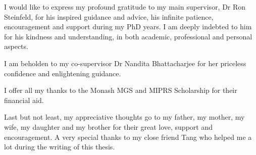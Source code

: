 
\begin{acknowledgements}      

I would like to express my profound gratitude to my main supervisor, Dr Ron Steinfeld, for his inspired guidance and advice, his infinite patience, encouragement and support during my PhD years. I am deeply indebted to him for his kindness and understanding, in both academic, professional and personal aspects.

I am beholden to my co-supervisor Dr Nandita Bhattacharjee for her priceless confidence and enlightening guidance.

I offer all my thanks to the Monash MGS and MIPRS Scholarship for their financial aid.

Last but not least, my appreciative thoughts go to my father, my mother, my wife, my daughter and my brother for their great love, support and encouragement. A very special thanks to my close friend Tang who helped me a lot during the writing of this thesis.

\end{acknowledgements}
